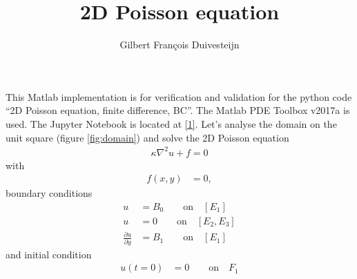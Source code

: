 \documentclass[11pt, a4paper]{article}
\title{2D Poisson equation}
\author{Gilbert Fran\c cois Duivesteijn}
\begin{document}
\maketitle


This Matlab implementation is for verification and validation for the python code ``2D Poisson equation, finite difference, BC''. The Matlab PDE Toolbox v2017a is used. The Jupyter Notebook is located at \href{https://github.com/gilbertfrancois/partial-differential-equations/blob/13b389383ceeaa74f6931c4458823bb683fb5a76/notebook/2D%20Poisson%20equation,%20finite%20difference,%20BC.ipynb}{[1]}. Let's analyse the domain on the unit square (figure \ref{fig:domain}) and solve the 2D Poisson equation 
\begin{align}
\kappa \nabla^2 u + f = 0\label{eq:pde}
\end{align}
with
\begin{align}
f(x, y) &= 0,
\end{align}
boundary conditions
\begin{align}
u &= B_0 \qquad \textrm{on} \quad [E_1] \label{eq:bc1}\\
u &= 0 \qquad \textrm{on} \quad [E_2, E_3] \label{eq:bc2}\\
\frac{\partial u}{\partial y} &= B_1 \qquad \textrm{on} \quad [E_1] \label{eq:bc3}
\end{align}
and initial condition
\begin{align}
u(t=0) &= 0	\qquad \textrm{on} \quad F_1 \label{eq:init}
\end{align}
\end{document}
